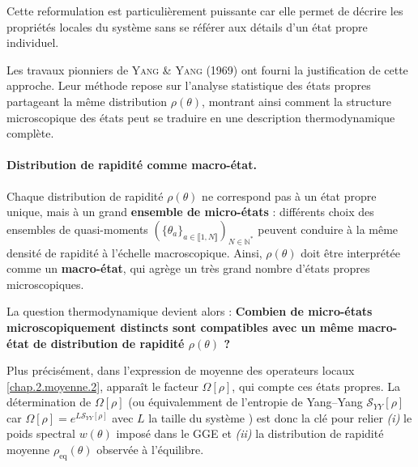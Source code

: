\medskip

Cette reformulation est particulièrement puissante car elle permet de décrire les propriétés locales du système sans se référer aux détails d’un état propre individuel.

\medskip

Les travaux pionniers de \textsc{Yang \& Yang} (1969) ont fourni la justification de cette approche. Leur méthode repose sur l’analyse statistique des états propres partageant la même distribution $\rho(\theta)$, montrant ainsi comment la structure microscopique des états peut se traduire en une description thermodynamique complète.


\paragraph{Distribution de rapidité comme macro-état.}

Chaque distribution de rapidité $\rho(\theta)$ ne correspond pas à un état propre unique, mais à un grand {\bf ensemble de micro-états} : différents choix des ensembles de quasi-moments $(\{\theta_a\}_{a \in \llbracket 1 , N \rrbracket })_{N \in \mathbb{N}^\ast} $ peuvent conduire à la même densité de rapidité à l’échelle macroscopique. Ainsi, $\rho(\theta)$ doit être interprétée comme un {\bf macro-état}, qui agrège un très grand nombre d’états propres microscopiques.

\medskip

La question thermodynamique devient alors : {\bf Combien de micro-états microscopiquement distincts sont compatibles avec un même macro-état de distribution de rapidité $\rho(\theta)$ ?} 

\medskip

Plus précisément, dans l’expression de moyenne des operateurs locaux \eqref{chap.2.moyenne.2}, apparaît le facteur
\(
\Omega[\rho]
\),
qui compte ces états propres.  
La détermination de $\Omega[\rho]$ (ou équivalemment de l’entropie de Yang–Yang $\mathcal{S}_{YY}[\rho]$ car 
\(
\Omega[\rho] = e^{L\mathcal{S}_{YY}[\rho]}
\)
avec $L$ la taille du système
) est donc la clé pour relier \emph{(i)} le poids spectral $w(\theta)$ imposé dans le GGE et \emph{(ii)} la distribution de rapidité moyenne $\rho_{\mathrm{eq}}(\theta)$ observée à l’équilibre.

